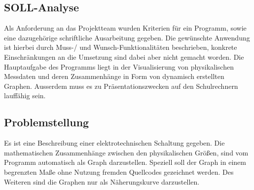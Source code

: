 \documentclass{article}
\begin{document}
\subsection{SOLL-Analyse}

    Als Anforderung an das Projektteam wurden Kriterien für ein Programm, sowie eine dazugehörige schriftliche Ausarbeitung gegeben. Die gewünschte Anwendung ist hierbei durch Muss-/ und Wunsch-Funktionalitäten beschrieben, konkrete Einschränkungen an die Umsetzung sind dabei aber nicht gemacht worden. Die Hauptaufgabe des Programms liegt in der Visualisierung von physikalischen Messdaten und deren Zusammenhänge in Form von dynamisch erstellten Graphen. Ausserdem muss es zu Präsentationszwecken auf den Schulrechnern lauffähig sein.

\subsection{Problemstellung}

    Es ist eine Beschreibung einer elektrotechnischen Schaltung gegeben. Die mathematischen Zusammenhänge zwischen den physikalischen Größen, sind vom Programm automatisch als Graph darzustellen. Speziell soll der Graph in einem begrenzten Maße ohne Nutzung fremden Quellcodes gezeichnet werden. Des Weiteren sind die Graphen nur als Näherungskurve darzustellen.
\end{document}
